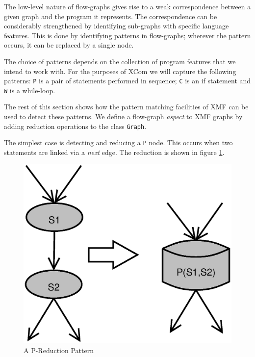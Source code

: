 \documentclass{article}
\begin{document}
The low-level nature of flow-graphs gives rise to a weak correspondence
between a given graph and the program it represents. The correspondence
can be considerably strengthened by identifying sub-graphs with specific
language features. This is done by identifying patterns in flow-graphs;
wherever the pattern occurs, it can be replaced by a single node.

The choice of patterns depends on the collection of program features that
we intend to work with. For the purposes of XCom we will capture the
following patterns: {\tt P} is a pair of statements performed in sequence;
{\tt C} is an if statement and {\tt W} is a while-loop. 

The rest of this section shows how the pattern matching facilities of XMF 
can be used to detect these patterns. We define a flow-graph {\em aspect}
to XMF graphs by adding reduction operations to the class {\tt Graph}.

The simplest case is detecting and reducing a {\tt P} node. This occurs 
when two statements are linked via a {\em next} edge. The reduction is
shown in figure \ref{PReduction}.

\begin{figure}
\begin{center}
\includegraphics[scale=0.4]{P}
\end{center}
\caption{A P-Reduction Pattern}
\label{PReduction}
\end{figure}
\end{document}
